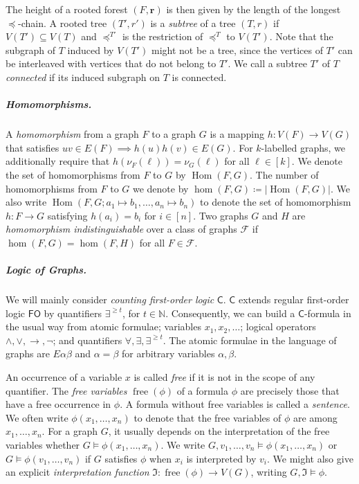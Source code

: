 \documentclass[10pt,a4paper]{article}
\newcommand{\N}{\ensuremath{\mathbb{N}}}
\newcommand{\I}{\ensuremath{\mathfrak I}}
\newcommand{\lFO}{\ensuremath{\mathsf{FO}}}
\newcommand{\lC} {\ensuremath{\mathsf C}}
\newcommand{\impl}{\ensuremath{\rightarrow}}
\newcommand{\tup}[1]{\ensuremath{\boldsymbol{#1}}}
\DeclareMathOperator{\free}{free}
\DeclareMathOperator{\HOM}{Hom}
\begin{document}
The height of a rooted forest $(F, \tup{r})$ is then given by the length of the longest $\preceq$-chain. A rooted tree $(T', r')$ is a \emph{subtree} of a tree $(T, r)$ if $V(T') \subseteq V(T)$ and $\preceq^{T'}$ is the restriction of $\preceq^T$ to $V(T')$. Note that the subgraph of $T$ induced by $V(T')$ might not be a tree, since the vertices of $T'$ can be interleaved with vertices that do not belong to $T'$. We call a subtree $T'$ of $T$ \emph{connected} if its induced subgraph on $T$ is connected.

\subparagraph{Homomorphisms.}
A \emph{homomorphism} from a graph $F$ to a graph $G$ is a mapping $h \colon V(F) \to V(G)$ that satisfies $uv \in E(F) \implies h(u)h(v) \in E(G)$. For $k$-labelled graphs, we additionally require that $h(\nu_F(\ell)) = \nu_G(\ell)$ for all $\ell \in [k]$.
We denote the set of homomorphisms from $F$ to $G$ by $\HOM(F, G)$. The number of homomorphisms from $F$ to $G$ we denote by $\hom(F, G) \coloneqq |\HOM(F, G)|$. We also write $\HOM(F, G; a_1 \mapsto b_1, \dots, a_n \mapsto b_n)$ to denote the set of homomorphism $h\colon F \to G$ satisfying $h(a_i) = b_i$ for $i \in [n]$.
Two graphs $G$ and $H$ are \emph{homomorphism indistinguishable} over a class of graphs $\mathcal{F}$ if $\hom(F, G) = \hom(F, H)$ for all $F \in \mathcal{F}$.

\subparagraph{Logic of Graphs.}



We will mainly consider \emph{counting first-order logic} $\lC$. $\lC$ extends regular first-order logic $\lFO$ by quantifiers $\exists^{\geq t}$, for $t \in \N$. Consequently, we can build a $\lC$-formula in the usual way from atomic formulae; variables $x_1, x_2, \dots$; logical operators $\land, \lor, \impl, \neg$; and quantifiers $\forall, \exists, \exists^{\geq t}$. The atomic formulae in the language of graphs are $E\alpha\beta$ and $\alpha = \beta$ for arbitrary variables $\alpha, \beta$.

An occurrence of a variable $x$ is called \emph{free} if it is not in the scope of any quantifier. The \emph{free variables} $\free(\phi)$ of a formula $\phi$ are precisely those that have a free occurrence in $\phi$. A formula without free variables is called a \emph{sentence}. We often write $\phi(x_1, \dots, x_n)$ to denote that the free variables of $\phi$ are among $x_1, \dots, x_n$. For a graph $G$, it usually depends on the interpretation of the free variables whether $G \models \phi(x_1, \dots, x_n)$. We write $G, v_1, \dots, v_n \models \phi(x_1, \dots, x_n)$ or $G \models \phi(v_1, \dots, v_n)$ if $G$ satisfies $\phi$ when $x_i$ is interpreted by $v_i$. We might also give an explicit \emph{interpretation function} $\I \colon \free(\phi) \to V(G)$, writing $G, \I \models \phi$.
\end{document}
